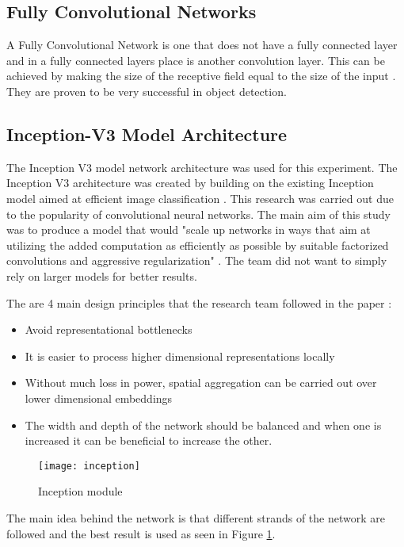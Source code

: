 \subsection*{Fully Convolutional Networks}
A Fully Convolutional Network is one that does not have a fully connected layer
and in a fully connected layers place is another convolution layer.
This can be achieved by making the size of the receptive field equal to the size of the input \parencite{digits}.
They are proven to be very successful in object detection.

\subsection*{Inception-V3 Model Architecture}
The Inception V3 model network architecture was used for this experiment. The
Inception V3 architecture was created by building on the existing Inception
model aimed at efficient image classification \parencite{rethinkingInception}.
This research was carried out due to the popularity of convolutional neural networks.
The main aim of this study was to produce a model that would "scale up networks in ways that aim at utilizing the added computation as efficiently as possible by suitable factorized convolutions and aggressive regularization" \parencite{rethinkingInception}.
The team did not want to simply rely on larger models for better results.

The are 4 main design principles that the research team followed in the paper \parencite{rethinkingInception}:
\begin{itemize}
    \item{Avoid representational bottlenecks}
    \item{It is easier to process higher dimensional representations locally}
    \item{Without much loss in power, spatial aggregation can be carried out over lower dimensional embeddings}
    \item{The width and depth of the network should be balanced and when one is increased it can be beneficial to increase the other.}
\end{itemize}

\begin{figure}
     \texttt{[image: inception]}
     \caption{Inception module \parencite{rethinkingInception}}
     \label{fig:inception}
\end{figure}

The main idea behind the network is that different strands of the network are followed and the best result is used as seen in Figure \ref{fig:inception}.

